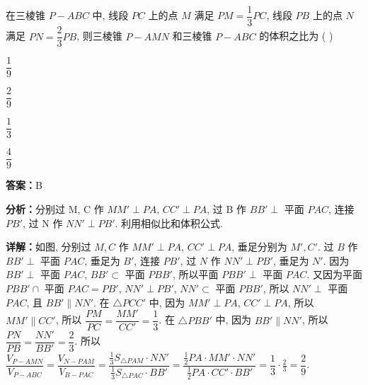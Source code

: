 \begin{question}[points=5]
在三棱锥 $P-ABC$ 中, 线段 $PC$ 上的点 $M$ 满足 $PM = \dfrac{1}{3}PC$, 线段 $PB$ 上的点 $N$ 满足 $PN = \dfrac{2}{3}PB$, 则三棱锥 $P-AMN$ 和三棱锥 $P-ABC$ 的体积之比为 ( )
\begin{choices}
  \item $\dfrac{1}{9}$
  \item $\dfrac{2}{9}$
  \item $\dfrac{1}{3}$
  \item $\dfrac{4}{9}$
\end{choices}
\begin{solution}
\textbf{答案：}B

\textbf{分析：}分别过 M, C 作 $MM' \perp PA$, $CC' \perp PA$, 过 B 作 $BB' \perp$ 平面 $PAC$, 连接 $PB'$, 过 N 作 $NN' \perp PB'$. 利用相似比和体积公式.

\textbf{详解：}如图, 分别过 $M, C$ 作 $MM' \perp PA$, $CC' \perp PA$, 垂足分别为 $M', C'$. 过 $B$ 作 $BB' \perp$ 平面 $PAC$, 垂足为 $B'$, 连接 $PB'$, 过 $N$ 作 $NN' \perp PB'$, 垂足为 $N'$. 因为 $BB' \perp$ 平面 $PAC$, $BB' \subset$ 平面 $PBB'$, 所以平面 $PBB' \perp$ 平面 $PAC$. 又因为平面 $PBB' \cap$ 平面 $PAC = PB'$, $NN' \perp PB'$, $NN' \subset$ 平面 $PBB'$, 所以 $NN' \perp$ 平面 $PAC$, 且 $BB' \parallel NN'$. 在 $\triangle PCC'$ 中, 因为 $MM' \perp PA$, $CC' \perp PA$, 所以 $MM' \parallel CC'$, 所以 $\dfrac{PM}{PC} = \dfrac{MM'}{CC'} = \dfrac{1}{3}$. 在 $\triangle PBB'$ 中, 因为 $BB' \parallel NN'$, 所以 $\dfrac{PN}{PB} = \dfrac{NN'}{BB'} = \dfrac{2}{3}$. 所以 $\dfrac{V_{P-AMN}}{V_{P-ABC}} = \dfrac{V_{N-PAM}}{V_{B-PAC}} = \dfrac{\frac{1}{3} S_{\triangle PAM} \cdot NN'}{\frac{1}{3} S_{\triangle PAC} \cdot BB'} = \dfrac{\frac{1}{2} PA \cdot MM' \cdot NN'}{\frac{1}{2} PA \cdot CC' \cdot BB'} = \dfrac{1}{3} \cdot \frac{2}{3} = \dfrac{2}{9}$.
\end{solution}
\end{question}

